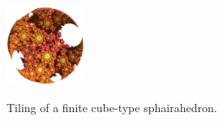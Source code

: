 \documentclass[dvipdfmx]{interact}
\theoremstyle{plain}%
\theoremstyle{definition}
\theoremstyle{remark}
\theoremstyle{problemstyle}
\begin{document}
\begin{figure}[H]
 \hspace*{\fill}
 \begin{minipage}[t]{0.18\textwidth}
  \centering
  \includegraphics[width=1in, height=1in, keepaspectratio]{./img/constructFractal/finiteProcess/final.png}
  \label{fig:sphaira-final}
 \end{minipage}
 \hspace*{\fill}
 \caption{Tiling of a finite cube-type sphairahedron.}
 \label{fig:sphairahedronTile}
\end{figure}
\end{document}
